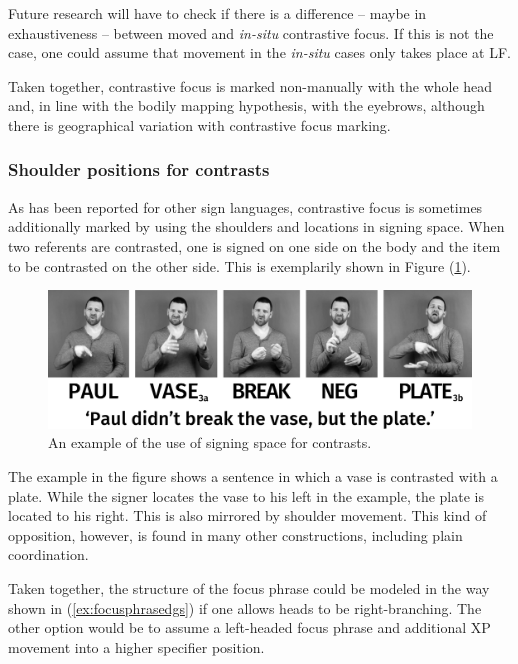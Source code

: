 \noindent Future research will have to check if there is a difference -- maybe in exhaustiveness -- between moved and \textit{in-situ} contrastive focus. If this is not the case, one could assume that movement in the \textit{in-situ} cases only takes place at LF.

Taken together, contrastive focus is marked non-manually with the whole head and, in line with the bodily mapping hypothesis, with the eyebrows, although there is geographical variation with contrastive focus marking.

\subsubsection{Shoulder positions for contrasts}
As has been reported for other sign languages, contrastive focus is sometimes additionally marked by using the shoulders and locations in signing space. When two referents are contrasted, one is signed on one side on the body and the item to be contrasted on the other side. This is exemplarily shown in Figure (\ref{contrastiveshoulders}).


\begin{figure}[bt]
\centering
	\includegraphics[width=1.0\textwidth]{contrastiveshoulderssw.jpg}
	\caption{An example of the use of signing space for contrasts.}
	\label{contrastiveshoulders}
\end{figure}

The example in the figure shows a sentence in which a vase is contrasted with a plate. While the signer locates the vase to his left in the example, the plate is located to his right. This is also mirrored by shoulder movement. This kind of opposition, however, is found in many other constructions, including plain coordination. 



Taken together, the structure of the focus phrase could be modeled in the way shown in (\ref{ex:focusphrasedgs}) if one allows heads to be right-branching. The other option would be to assume a left-headed focus phrase and additional XP movement into a higher specifier position.

